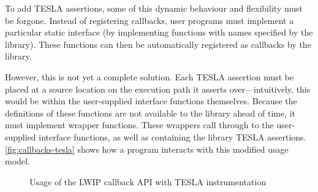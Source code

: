 To add TESLA assertions, some of this dynamic behaviour and flexibility must be
forgone. Instead of registering callbacks, user programs must implement a
particular static interface (by implementing functions with names specified by
the library). These functions can then be automatically registered as callbacks
by the library.

However, this is not yet a complete solution. Each TESLA assertion must be
placed at a source location on the execution path it asserts over---intuitively,
this would be within the user-supplied interface functions themselves. Because
the definitions of these functions are not available to the library ahead of time, it must
implement wrapper functions. These wrappers call through to the user-supplied
interface functions, as well as containing the library TESLA assertions.
\autoref{fig:callbacks-tesla} shows how a program interacts with this modified
usage model.

\begin{figure}[ht]
  \centering
  \caption{Usage of the LWIP callback API with TESLA instrumentation}
  \label{fig:callbacks-tesla}
\end{figure}

